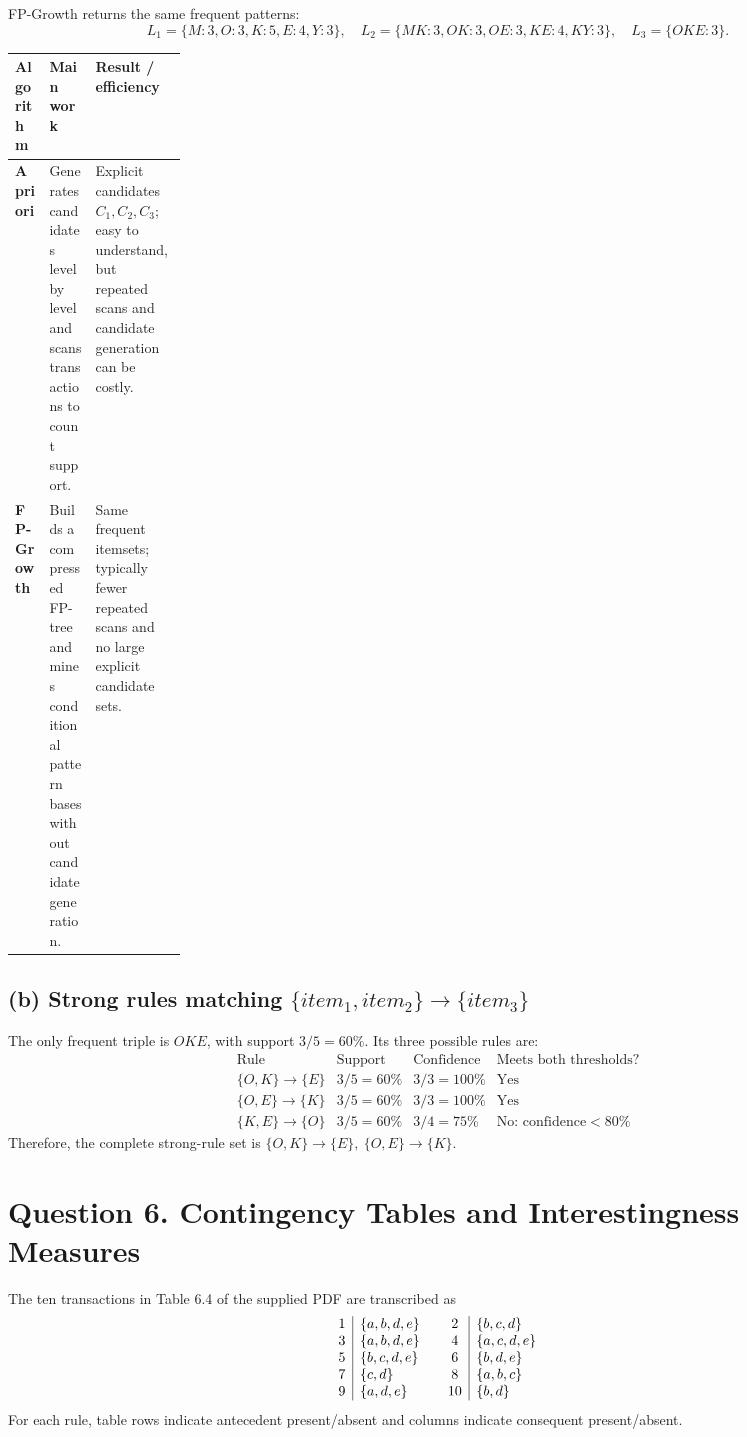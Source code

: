 \documentclass[11pt,a4paper]{article}
\begin{document}
FP-Growth returns the same frequent patterns:
\[
L_1=\{M:3,O:3,K:5,E:4,Y:3\},\quad
L_2=\{MK:3,OK:3,OE:3,KE:4,KY:3\},\quad L_3=\{OKE:3\}.
\]
\begin{center}
\small
\begin{tabularx}{\linewidth}{>{\bfseries}p{0.2\linewidth}XX}
\toprule
Algorithm & Main work & Result / efficiency\\
\midrule
Apriori & Generates candidates level by level and scans transactions to count support. & Explicit candidates \(C_1,C_2,C_3\); easy to understand, but repeated scans and candidate generation can be costly.\\
FP-Growth & Builds a compressed FP-tree and mines conditional pattern bases without candidate generation. & Same frequent itemsets; typically fewer repeated scans and no large explicit candidate sets.\\
\bottomrule
\end{tabularx}
\end{center}

\subsection*{(b) Strong rules matching \(\{item_1,item_2\}\to\{item_3\}\)}
The only frequent triple is \(OKE\), with support \(3/5=60\%\). Its three possible rules are:
\[
\begin{array}{c|c|c|c}
\text{Rule}&\text{Support}&\text{Confidence}&\text{Meets both thresholds?}\\ \hline
\{O,K\}\to\{E\}&3/5=60\%&3/3=100\%&\text{Yes}\\
\{O,E\}\to\{K\}&3/5=60\%&3/3=100\%&\text{Yes}\\
\{K,E\}\to\{O\}&3/5=60\%&3/4=75\%&\text{No: confidence}<80\%
\end{array}
\]
Therefore, the complete strong-rule set is
\(\boxed{\{O,K\}\to\{E\},\ \{O,E\}\to\{K\}}\).

\section*{Question 6. Contingency Tables and Interestingness Measures}
The ten transactions in Table 6.4 of the supplied PDF are transcribed as
\[
\begin{array}{c|l@{\qquad}c|l}
1&\{a,b,d,e\}&2&\{b,c,d\}\\
3&\{a,b,d,e\}&4&\{a,c,d,e\}\\
5&\{b,c,d,e\}&6&\{b,d,e\}\\
7&\{c,d\}&8&\{a,b,c\}\\
9&\{a,d,e\}&10&\{b,d\}
\end{array}
\]
For each rule, table rows indicate antecedent present/absent and columns indicate consequent present/absent.
\end{document}

